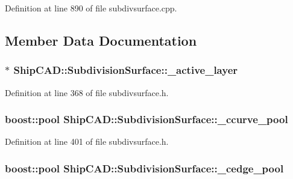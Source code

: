 Definition at line 890 of file subdivsurface.\-cpp.



\subsection{Member Data Documentation}
\hypertarget{classShipCAD_1_1SubdivisionSurface_aef766e0b62189247c0f3214c56800040}{
\subsubsection[{\-\_\-active\-\_\-layer}]{$\ast$ Ship\-C\-A\-D\-::\-Subdivision\-Surface\-::\-\_\-active\-\_\-layer\hspace{0.3cm}{\ttfamily [protected]}}}\label{classShipCAD_1_1SubdivisionSurface_aef766e0b62189247c0f3214c56800040}


Definition at line 368 of file subdivsurface.\-h.

\hypertarget{classShipCAD_1_1SubdivisionSurface_ae20f94c83bac02bae90a905379765b0a}{
\subsubsection[{\-\_\-ccurve\-\_\-pool}]{\setlength{\rightskip}{0pt plus 5cm}boost\-::pool Ship\-C\-A\-D\-::\-Subdivision\-Surface\-::\-\_\-ccurve\-\_\-pool\hspace{0.3cm}{\ttfamily [protected]}}}\label{classShipCAD_1_1SubdivisionSurface_ae20f94c83bac02bae90a905379765b0a}


Definition at line 401 of file subdivsurface.\-h.

\hypertarget{classShipCAD_1_1SubdivisionSurface_a413da68890d958a7994d09e0906be102}{
\subsubsection[{\-\_\-cedge\-\_\-pool}]{\setlength{\rightskip}{0pt plus 5cm}boost\-::pool Ship\-C\-A\-D\-::\-Subdivision\-Surface\-::\-\_\-cedge\-\_\-pool\hspace{0.3cm}{\ttfamily [protected]}}}\label{classShipCAD_1_1SubdivisionSurface_a413da68890d958a7994d09e0906be102}


